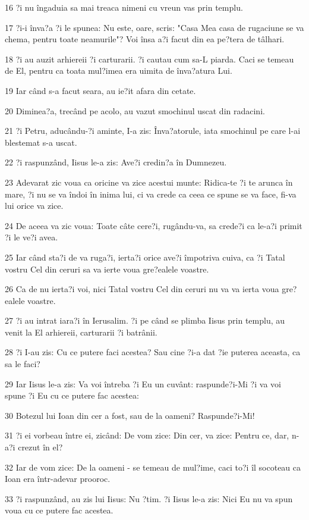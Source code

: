 \par 16 ?i nu îngaduia sa mai treaca nimeni cu vreun vas prin templu.
\par 17 ?i-i înva?a ?i le spunea: Nu este, oare, scris: "Casa Mea casa de rugaciune se va chema, pentru toate neamurile"? Voi însa a?i facut din ea pe?tera de tâlhari.
\par 18 ?i au auzit arhiereii ?i carturarii. ?i cautau cum sa-L piarda. Caci se temeau de El, pentru ca toata mul?imea era uimita de înva?atura Lui.
\par 19 Iar când s-a facut seara, au ie?it afara din cetate.
\par 20 Diminea?a, trecând pe acolo, au vazut smochinul uscat din radacini.
\par 21 ?i Petru, aducându-?i aminte, I-a zis: Înva?atorule, iata smochinul pe care l-ai blestemat s-a uscat.
\par 22 ?i raspunzând, Iisus le-a zis: Ave?i credin?a în Dumnezeu.
\par 23 Adevarat zic voua ca oricine va zice acestui munte: Ridica-te ?i te arunca în mare, ?i nu se va îndoi în inima lui, ci va crede ca ceea ce spune se va face, fi-va lui orice va zice.
\par 24 De aceea va zic voua: Toate câte cere?i, rugându-va, sa crede?i ca le-a?i primit ?i le ve?i avea.
\par 25 Iar când sta?i de va ruga?i, ierta?i orice ave?i împotriva cuiva, ca ?i Tatal vostru Cel din ceruri sa va ierte voua gre?ealele voastre.
\par 26 Ca de nu ierta?i voi, nici Tatal vostru Cel din ceruri nu va va ierta voua gre?ealele voastre.
\par 27 ?i au intrat iara?i în Ierusalim. ?i pe când se plimba Iisus prin templu, au venit la El arhiereii, carturarii ?i batrânii.
\par 28 ?i I-au zis: Cu ce putere faci acestea? Sau cine ?i-a dat ?ie puterea aceasta, ca sa le faci?
\par 29 Iar Iisus le-a zis: Va voi întreba ?i Eu un cuvânt: raspunde?i-Mi ?i va voi spune ?i Eu cu ce putere fac acestea:
\par 30 Botezul lui Ioan din cer a fost, sau de la oameni? Raspunde?i-Mi!
\par 31 ?i ei vorbeau între ei, zicând: De vom zice: Din cer, va zice: Pentru ce, dar, n-a?i crezut în el?
\par 32 Iar de vom zice: De la oameni - se temeau de mul?ime, caci to?i îl socoteau ca Ioan era într-adevar prooroc.
\par 33 ?i raspunzând, au zis lui Iisus: Nu ?tim. ?i Iisus le-a zis: Nici Eu nu va spun voua cu ce putere fac acestea.


